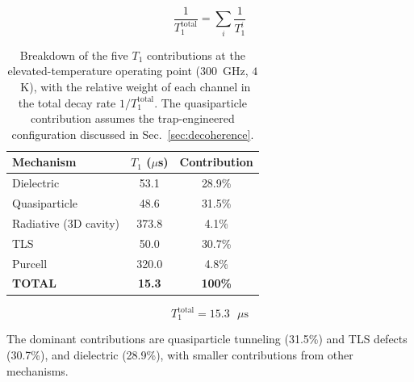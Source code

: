 \begin{equation}
\frac{1}{T_1^{\text{total}}} = \sum_i \frac{1}{T_1^i}
\end{equation}

\begin{table}[H]
\centering
\caption{Breakdown of the five $T_1$ contributions at the elevated-temperature operating point ($300$~GHz, $4$~K), with the relative weight of each channel in the total decay rate $1/T_1^{\text{total}}$. The quasiparticle contribution assumes the trap-engineered configuration discussed in Sec.~\ref{sec:decoherence}.}
\begin{tabular}{@{}lcc@{}}
\toprule
Mechanism & $T_1$ ($\mu$s) & Contribution \\
\midrule
Dielectric & 53.1 & 28.9\% \\
Quasiparticle & 48.6 & 31.5\% \\
Radiative (3D cavity) & 373.8 & 4.1\% \\
TLS & 50.0 & 30.7\% \\
Purcell & 320.0 & 4.8\% \\
\midrule
\textbf{TOTAL} & \textbf{15.3} & \textbf{100\%} \\
\bottomrule
\end{tabular}
\end{table}

\begin{equation}
\boxed{T_1^{\text{total}} = 15.3 \text{ }\mu\text{s}}
\end{equation}

The dominant contributions are quasiparticle tunneling (31.5\%) and TLS defects (30.7\%), and dielectric (28.9\%), with smaller contributions from other mechanisms.

